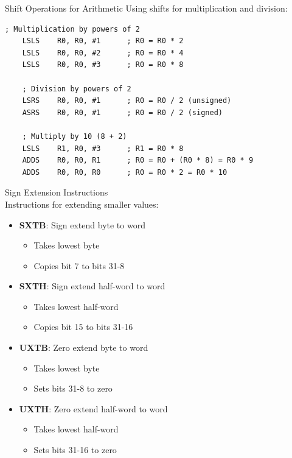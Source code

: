 \begin{example2}{Shift Operations for Arithmetic}
Using shifts for multiplication and division:
\begin{lstlisting}[language=armasm, style=base]
    ; Multiplication by powers of 2
    LSLS    R0, R0, #1      ; R0 = R0 * 2
    LSLS    R0, R0, #2      ; R0 = R0 * 4
    LSLS    R0, R0, #3      ; R0 = R0 * 8
    
    ; Division by powers of 2
    LSRS    R0, R0, #1      ; R0 = R0 / 2 (unsigned)
    ASRS    R0, R0, #1      ; R0 = R0 / 2 (signed)
    
    ; Multiply by 10 (8 + 2)
    LSLS    R1, R0, #3      ; R1 = R0 * 8
    ADDS    R0, R0, R1      ; R0 = R0 + (R0 * 8) = R0 * 9
    ADDS    R0, R0, R0      ; R0 = R0 * 2 = R0 * 10
\end{lstlisting}
\end{example2}

\begin{concept}{Sign Extension Instructions}\\
Instructions for extending smaller values:
\begin{itemize}
  \item \textbf{SXTB}: Sign extend byte to word
    \begin{itemize}
      \item Takes lowest byte
      \item Copies bit 7 to bits 31-8
    \end{itemize}
  \item \textbf{SXTH}: Sign extend half-word to word
    \begin{itemize}
      \item Takes lowest half-word
      \item Copies bit 15 to bits 31-16
    \end{itemize}
  \item \textbf{UXTB}: Zero extend byte to word
    \begin{itemize}
      \item Takes lowest byte
      \item Sets bits 31-8 to zero
    \end{itemize}
  \item \textbf{UXTH}: Zero extend half-word to word
    \begin{itemize}
      \item Takes lowest half-word
      \item Sets bits 31-16 to zero
    \end{itemize}
\end{itemize}
\end{concept}

